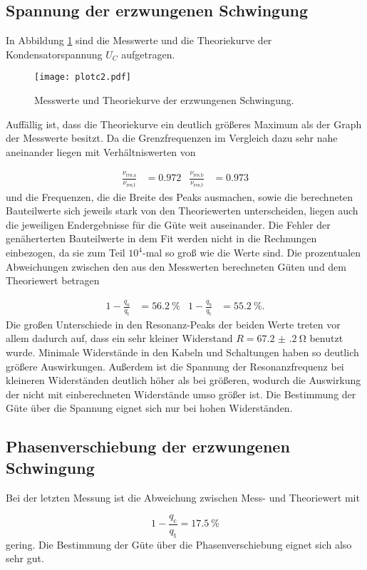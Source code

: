 \subsection{Spannung der erzwungenen Schwingung}

In Abbildung \ref{fig:Theo} sind die Messwerte und die Theoriekurve der
Kondensatorspannung $U_C$ aufgetragen.

\newpage

\begin{figure}[h]
  \centering
  \texttt{[image: plotc2.pdf]}
  \caption{Messwerte und Theoriekurve der erzwungenen Schwingung.}
  \label{fig:Theo}
\end{figure}

Auffällig ist, dass die Theoriekurve ein deutlich größeres Maximum als der
Graph der Messwerte besitzt. Da die Grenzfrequenzen im Vergleich dazu
sehr nahe aneinander liegen mit Verhältniswerten von

\begin{align}
  \frac{\nu_\text{res,a}}{\nu_\text{res,t}} & = 0.972 &
  \frac{\nu_\text{res,b}}{\nu_\text{res,t}} & = 0.973
\end{align}
und die Frequenzen, die die Breite des Peaks ausmachen, sowie die berechneten
Bauteilwerte sich jeweils stark von den Theoriewerten unterscheiden,
liegen auch die jeweiligen Endergebnisse für die Güte weit auseinander.
Die Fehler der genäherterten Bauteilwerte in dem Fit werden nicht in die
Rechnungen einbezogen, da sie zum Teil $10^4$-mal so groß wie die
Werte sind.
Die prozentualen Abweichungen zwischen den aus den Messwerten berechneten Güten
und dem Theoriewert betragen

\begin{align}
  1 - \frac{q_a}{q_\text{t}} & = \SI{56.2}{\percent} &
  1 - \frac{q_b}{q_\text{t}} & = \SI{55.2}{\percent}.
\end{align}
Die großen Unterschiede in den Resonanz-Peaks der beiden Werte treten vor allem
dadurch auf, dass ein sehr kleiner Widerstand $R = \SI{67.2(2)}{\ohm}$
benutzt wurde. Minimale Widerstände in den Kabeln und Schaltungen
haben so deutlich größere Auswirkungen.
Außerdem ist die Spannung der Resonanzfrequenz bei kleineren Widerständen
deutlich höher als bei größeren, wodurch die Auswirkung der nicht mit
einberechneten Widerstände umso größer ist.
Die Bestimmung der Güte über die Spannung eignet sich nur bei hohen
Widerständen.

\subsection{Phasenverschiebung der erzwungenen Schwingung}

Bei der letzten Messung ist die Abweichung zwischen Mess- und Theoriewert
mit

\begin{equation}
  1-\frac{q_\text{c}}{q_\text{t}} =
  \SI{17.5}{\percent}
\end{equation}
gering.
Die Bestimmung der Güte über die Phasenverschiebung eignet sich also sehr gut.
